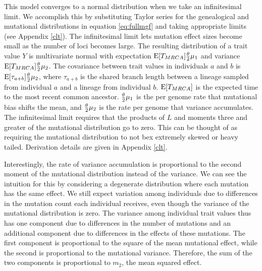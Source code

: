This model converges to a normal distribution when we take an infinitesimal
limit. We accomplish this by substituting Taylor series for the genealogical and
mutational distributions in equation \eqref{eq:fullmgf} and taking appropriate
limits (see Appendix \ref{clt}). The infinitesimal limit lets mutation effect
sizes become small as the number of loci becomes large. The resulting
distribution of a trait value $Y$ is multivariate normal with expectation
$\mathrm{E}[T_{MRCA}] \frac{\theta}{2} \mu_1$ and variance $\mathrm{E}[T_{MRCA}] \frac{\theta}{2} \mu_2$. The covariance
between trait values in individuals $a$ and $b$ is $\mathrm{E}[\tau_{a+b}] \frac{\theta}{2} \mu_2$,
where $\tau_{a+b}$ is the shared branch length between a lineage sampled from
individual $a$ and a lineage from individual $b$. $\mathrm{E}[T_{MRCA}]$ is the expected
time to the most recent common ancestor. $\frac{\theta}{2} \mu_1$ is the per genome rate that
mutational bias shifts the mean, and $\frac{\theta}{2} \mu_2$ is the rate per genome that
variance accumulates. The infinitesimal limit requires that the products of $L$
and moments three and greater of the mutational distribution go to zero. This
can be thought of as requiring the mutational distribution to not bex extremely
skewed or heavy tailed. Derivation details are given in Appendix \ref{clt}.

Interestingly, the rate of variance accumulation is proportional to the second
moment of the mutational distribution instead of the variance. We can see the
intuition for this by considering a degenerate distribution where each mutation
has the same effect. We still expect variation among individuals due to
differences in the mutation count each individual receives, even though the
variance of the mutational distribution is zero. The variance among individual
trait values thus has one component due to differences in the number of
mutations and an additional component due to differences in the effects of these
mutations. The first component is proportional to the square of the mean
mutational effect, while the second is proportional to the mutational variance.
Therefore, the sum of the two components is proportional to $m_2$, the mean
squared effect.


